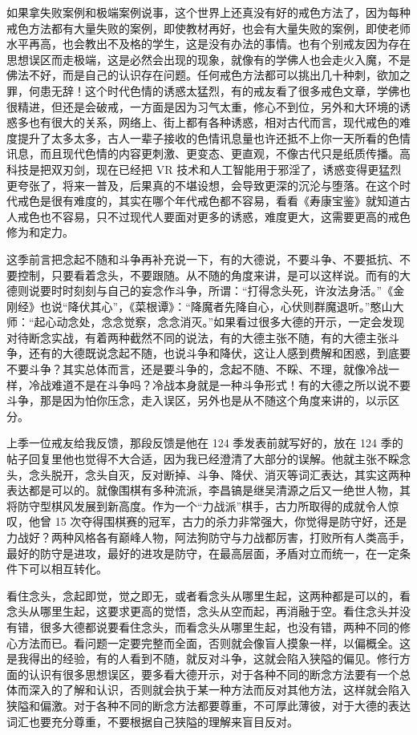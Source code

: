 如果拿失败案例和极端案例说事，这个世界上还真没有好的戒色方法了，因为每种戒色方法都有大量失败的案例，即使教材再好，也会有大量失败的案例，即使老师水平再高，也会教出不及格的学生，这是没有办法的事情。也有个别戒友因为存在思想误区而走极端，这是必然会出现的现象，就像有的学佛人也会走火入魔，不是佛法不好，而是自己的认识存在问题。任何戒色方法都可以挑出几十种刺，欲加之罪，何患无辞！这个时代色情的诱惑太猛烈，有的戒友看了很多戒色文章，学佛也很精进，但还是会破戒，一方面是因为习气太重，修心不到位，另外和大环境的诱惑多也有很大的关系，网络上、街上都有各种诱惑，相对古代而言，现代戒色的难度提升了太多太多，古人一辈子接收的色情讯息量也许还抵不上你一天所看的色情讯息，而且现代色情的内容更刺激、更变态、更直观，不像古代只是纸质传播。高科技是把双刃剑，现在已经把 VR 技术和人工智能用于邪淫了，诱惑变得更猛烈更夸张了，将来一普及，后果真的不堪设想，会导致更深的沉沦与堕落。在这个时代戒色是很有难度的，其实在哪个年代戒色都不容易，看看《寿康宝鉴》就知道古人戒色也不容易，只不过现代人要面对更多的诱惑，难度更大，这需要更高的戒色修为和定力。

这季前言把念起不随和斗争再补充说一下，有的大德说，不要斗争、不要抵抗、不要控制，只要看着念头，不要跟随。从不随的角度来讲，是可以这样说。而有的大德则说要时时刻刻与自己的妄念作斗争，所谓：“打得念头死，许汝法身活。”《金刚经》也说“降伏其心”，《菜根谭》：“降魔者先降自心，心伏则群魔退听。”憨山大师：“起心动念处，念念觉察，念念消灭。”如果看过很多大德的开示，一定会发现对待断念实战，有着两种截然不同的说法，有的大德主张不随，有的大德主张斗争，还有的大德既说念起不随，也说斗争和降伏，这让人感到费解和困惑，到底要不要斗争？其实总体而言，还是要斗争的，念起不随、不睬、不理，就像冷战一样，冷战难道不是在斗争吗？冷战本身就是一种斗争形式！有的大德之所以说不要斗争，那是因为怕你压念，走入误区，另外也是从不随这个角度来讲的，以示区分。

上季一位戒友给我反馈，那段反馈是他在 124 季发表前就写好的，放在 124 季的帖子回复里他也觉得不大合适，因为我已经澄清了大部分的误解。他就主张不睬念头，念头脱开，念头自灭，反对断掉、斗争、降伏、消灭等词汇表达，其实这两种表达都是可以的。就像围棋有多种流派，李昌镐是继吴清源之后又一绝世人物，其将防守型棋风发展到新高度。作为一个“力战派”棋手，古力所取得的成就令人惊叹，他曾 15 次夺得围棋赛的冠军，古力的杀力非常强大，你觉得是防守好，还是力战好？两种风格各有巅峰人物，阿法狗防守与力战都厉害，打败所有人类高手，最好的防守是进攻，最好的进攻是防守，在最高层面，矛盾对立而统一，在一定条件下可以相互转化。

看住念头，念起即觉，觉之即无，或者看念头从哪里生起，这两种都是可以的，看念头从哪里生起，这要求更高的觉悟，念头从空而起，再消融于空。看住念头并没有错，很多大德都说要看住念头，而看念头从哪里生起，也没有错，两种不同的修心方法而已。看问题一定要完整而全面，否则就会像盲人摸象一样，以偏概全。这是我得出的经验，有的人看到不随，就反对斗争，这就会陷入狭隘的偏见。修行方面的认识有很多思想误区，要多看大德开示，对于各种不同的断念方法要有一个总体而深入的了解和认识，否则就会执于某一种方法而反对其他方法，这样就会陷入狭隘和偏激。对于各种不同的断念方法都要尊重，不可厚此薄彼，对于大德的表达词汇也要充分尊重，不要根据自己狭隘的理解来盲目反对。

